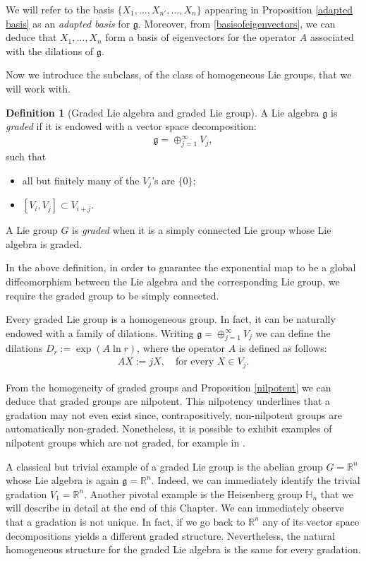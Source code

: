 \documentclass[12pt,oneside,a4paper]{book}
\numberwithin{equation}{section}     %
\theoremstyle{plain}
\theoremstyle{definition}
\newtheorem{definition}[theorem]{Definition}
\newcommand{\R}{{\mathbb R}}
\newcommand{\Rn}{{\R}^n}
\begin{document}
We will refer to the basis $\{X_1,\dots,X_{n'},\dots,X_n\}$ appearing in Proposition \ref{adapted basis} as an \textit{adapted basis} for $\mathfrak{g}$. Moreover, from \eqref{basisofeigenvectors}, we can deduce that $X_1,\dots, X_n$ form a basis of eigenvectors for the operator $A$ associated with the dilations of $\mathfrak{g}$.

Now we introduce the subclass, of the class of homogeneous Lie groups, that we will work with.
\begin{definition}[Graded Lie algebra and graded Lie group]\label{defGraded}
	A Lie algebra $\mathfrak g$ is \textit{graded} if it is endowed with a vector space decomposition:
	\begin{align*}
	\mathfrak g = \oplus_{j=1}^\infty V_j,
	\end{align*}
	such that 
	\begin{itemize}
		\item all but finitely many of the $V_j$'s are $\{0\}$;
		\item $[V_i,V_j]\subset V_{i+j}$.
	\end{itemize}
	A Lie group $G$ is \textit{graded} when it is a simply connected Lie group whose Lie algebra is graded.
\end{definition}
In the above definition, in order to guarantee the exponential map to be a global diffeomorphism between the Lie algebra and the corresponding Lie group, we require the graded group to be simply connected. 

Every graded Lie group is a homogeneous group. In fact, it can be naturally endowed with a family of dilations. Writing $\mathfrak{g}=\oplus_{j=1}^\infty V_j$ we can define the dilations $D_r:=\exp(A\ln r)$, where the operator $A$ is defined as follows:
\begin{align}
\label{EQ:naturaldilationsA}
AX:=jX,\quad\text{for every }X\in V_j.
\end{align}

From the homogeneity of graded groups and Proposition \ref{nilpotent} we can deduce that graded groups are nilpotent. This nilpotency underlines that a gradation may not even exist since, contrapositively, non-nilpotent groups are automatically non-graded. Nonetheless, it is possible to exhibit examples of nilpotent groups which are not graded, for example in \cite{G76,FR2016}. 

A classical but trivial example of a graded Lie group is the abelian group $G=\Rn$ whose Lie algebra is again $\mathfrak{g}=\Rn$. Indeed, we can immediately identify the trivial gradation $V_1=\Rn$. Another pivotal example is the Heisenberg group $\mathbb{H}_n$ that we will describe in detail at the end of this Chapter. We can immediately observe that a gradation is not unique. In fact, if we go back to $\Rn$ any of its vector space decompositions yields a different graded structure. Nevertheless, the natural homogeneous structure for the graded Lie algebra is the same for every gradation.
\end{document}
